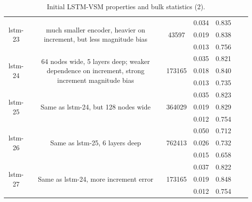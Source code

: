 \begin{table}[H]
\begin{sideways}
\begin{tabular}{c|c|c|c|c|c|c }
\hline
\multirow{3}{6em}{lstm-23} & \multirow{3}{16em}{much smaller encoder, heavier on increment, but less magnitude bias} & \multirow{3}{4em}{43597} & 0.034 & 0.835 &  &  \\ & & & 0.019 & 0.838 &  &  \\ & & & 0.013 & 0.756 &  &  \\
\hline
\multirow{3}{6em}{lstm-24} & \multirow{3}{16em}{64 nodes wide, 5 layers deep; weaker dependence on increment, strong increment magnitude bias} & \multirow{3}{4em}{173165} & 0.035 & 0.821 &  &  \\ & & & 0.018 & 0.840 &  &  \\ & & & 0.013 & 0.735 &  &  \\
\hline
\multirow{3}{6em}{lstm-25} & \multirow{3}{16em}{Same as lstm-24, but 128 nodes wide} & \multirow{3}{4em}{364029} & 0.035 & 0.823 &  &  \\ & & & 0.019 & 0.829 &  &  \\ & & & 0.012 & 0.754 &  &  \\
\hline
\multirow{3}{6em}{lstm-26} & \multirow{3}{16em}{Same as lstm-25, 6 layers deep} & \multirow{3}{4em}{762413} & 0.050 & 0.712 &  &  \\ & & & 0.026 & 0.732 &  &  \\ & & & 0.015 & 0.658 &  &  \\
\hline
\multirow{3}{6em}{lstm-27} & \multirow{3}{16em}{Same as lstm-24, more increment error} & \multirow{3}{4em}{173165} & 0.037 & 0.822 &  &  \\ & & & 0.019 & 0.848 &  &  \\ & & & 0.012 & 0.754 &  &  \\
    \end{tabular}
\centering
\end{sideways}
    \caption{Initial LSTM-VSM properties and bulk statistics (2).}
    \label{model-init-lstm-table-2}
\end{table}


